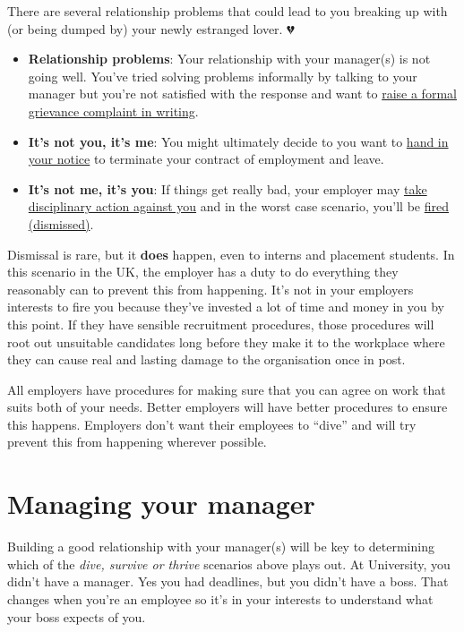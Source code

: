 \documentclass[
]{book}
\providecommand{\tightlist}{%
  \setlength{\itemsep}{0pt}\setlength{\parskip}{0pt}}
\begin{document}
There are several relationship problems that could lead to you breaking up with (or being dumped by) your newly estranged lover. 💔

\begin{itemize}
\tightlist
\item
  \textbf{Relationship problems}: Your relationship with your manager(s) is not going well. You've tried solving problems informally by talking to your manager but you're not satisfied with the response and want to \href{https://www.gov.uk/raise-grievance-at-work}{raise a formal grievance complaint in writing}. \citep{grievance}
\item
  \textbf{It's not you, it's me}: You might ultimately decide to you want to \href{https://www.gov.uk/handing-in-your-notice}{hand in your notice} to terminate your contract of employment and leave. \citep{iquit}
\item
  \textbf{It's not me, it's you}: If things get really bad, your employer may \href{https://www.gov.uk/disciplinary-procedures-and-action-at-work}{take disciplinary action against you} \citep{dive} and in the worst case scenario, you'll be \href{https://www.gov.uk/dismissal}{fired (dismissed)}. \citep{yourefired}
\end{itemize}

Dismissal is rare, but it \textbf{does} happen, even to interns and placement students. In this scenario in the UK, the employer has a duty to do everything they reasonably can to prevent this from happening. It's not in your employers interests to fire you because they've invested a lot of time and money in you by this point. If they have sensible recruitment procedures, those procedures will root out unsuitable candidates long before they make it to the workplace where they can cause real and lasting damage to the organisation once in post.

All employers have procedures for making sure that you can agree on work that suits both of your needs. Better employers will have better procedures to ensure this happens. Employers don't want their employees to ``dive'' and will try prevent this from happening wherever possible.

\hypertarget{manager}{%
\section{Managing your manager}\label{manager}}

Building a good relationship with your manager(s) will be key to determining which of the \emph{dive, survive or thrive} scenarios above plays out. At University, you didn't have a manager. Yes you had deadlines, but you didn't have a boss. That changes when you're an employee so it's in your interests to understand what your boss expects of you.
\end{document}
